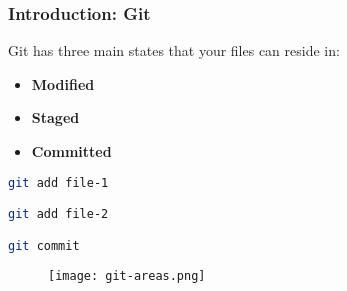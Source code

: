 \begin{frame}[fragile]

\frametitle{Introduction: Git}

\begin{multicols}{2}
Git has three main states that your files can reside in:

\begin{itemize}[<+->]
\item \textbf{Modified}
\item \textbf{Staged}
\item \textbf{Committed}
\end{itemize}

\vspace{1cm}

\begin{lstlisting}[language=Bash]
git add file-1

git add file-2

git commit
\end{lstlisting}

\end{multicols}

\begin{figure}
\centering
\texttt{[image: git-areas.png]}

\end{figure}

\end{frame}